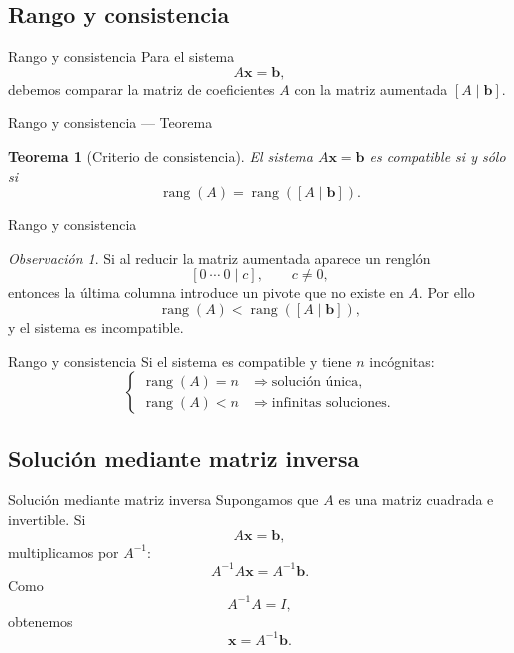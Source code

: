 \documentclass[aspectratio=169,11pt]{beamer}
\newtheorem{teorema}[definicion]{Teorema}
\theoremstyle{remark}
\newtheorem{observacion}[definicion]{Observación}
\newcommand{\rank}{\operatorname{rang}}
\begin{document}
\subsection*{Rango y consistencia}
\begin{frame}[allowframebreaks]{Rango y consistencia}
\footnotesize
Para el sistema
\[
A\mathbf{x}=\mathbf b,
\]
debemos comparar la matriz de coeficientes $A$ con la matriz aumentada $[A\mid\mathbf b]$.
\end{frame}

\begin{frame}[shrink=5]{Rango y consistencia — Teorema}
\footnotesize
\begin{teorema}[Criterio de consistencia]
El sistema $A\mathbf{x}=\mathbf b$ es compatible si y sólo si
\[
\rank(A)=\rank([A\mid\mathbf b]).
\]
\end{teorema}
\end{frame}

\begin{frame}[shrink=5]{Rango y consistencia}
\footnotesize
\begin{observacion}
Si al reducir la matriz aumentada aparece un renglón
\[
[0\ \cdots\ 0\mid c],\qquad c\neq0,
\]
entonces la última columna introduce un pivote que no existe en $A$. Por ello
\[
\rank(A)<\rank([A\mid\mathbf b]),
\]
y el sistema es incompatible.
\end{observacion}
\end{frame}

\begin{frame}[allowframebreaks]{Rango y consistencia}
\footnotesize
Si el sistema es compatible y tiene $n$ incógnitas:
\[
\begin{cases}
\rank(A)=n &\Longrightarrow \text{solución única},\\
\rank(A)<n &\Longrightarrow \text{infinitas soluciones}.
\end{cases}
\]
\end{frame}

\subsection*{Solución mediante matriz inversa}
\begin{frame}[allowframebreaks]{Solución mediante matriz inversa}
\footnotesize
Supongamos que $A$ es una matriz cuadrada e invertible. Si
\[
A\mathbf{x}=\mathbf b,
\]
multiplicamos por $A^{-1}$:
\[
A^{-1}A\mathbf{x}=A^{-1}\mathbf b.
\]
Como
\[
A^{-1}A=I,
\]
obtenemos
\[
\boxed{\mathbf{x}=A^{-1}\mathbf b.}
\]
\end{frame}
\end{document}
